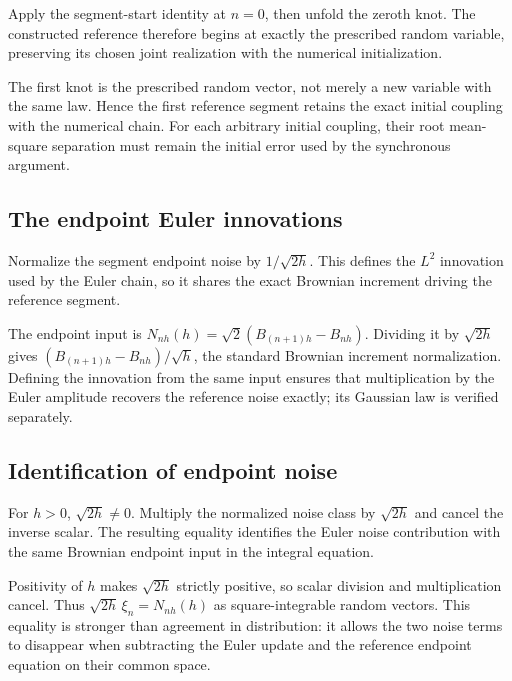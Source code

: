 \documentclass[11pt,a4paper]{report}
\begin{document}
Apply the segment-start identity at \(n=0\), then unfold the zeroth knot. The constructed reference therefore begins at exactly the prescribed random variable, preserving its chosen joint realization with the numerical initialization.



The first knot is the prescribed random vector, not merely a new variable with the same law. Hence the first reference segment retains the exact initial coupling with the numerical chain. For each arbitrary initial coupling, their root mean-square separation must remain the initial error used by the synchronous argument.

\subsection{\texorpdfstring{The endpoint Euler innovations}{The endpoint Euler innovations}}
\label{report-step-UnadjustedLangevin-BrownianReference-lean-7}


Normalize the segment endpoint noise by \(1/\sqrt{2h}\). This defines the \(L^2\) innovation used by the Euler chain, so it shares the exact Brownian increment driving the reference segment.



The endpoint input is \(N_{nh}(h)=\sqrt2(B_{(n+1)h}-B_{nh})\). Dividing it by \(\sqrt{2h}\) gives \((B_{(n+1)h}-B_{nh})/\sqrt h\), the standard Brownian increment normalization. Defining the innovation from the same input ensures that multiplication by the Euler amplitude recovers the reference noise exactly; its Gaussian law is verified separately.

\subsection{\texorpdfstring{Identification of endpoint noise}{Identification of endpoint noise}}
\label{report-step-UnadjustedLangevin-BrownianReference-lean-8}


For \(h>0\), \(\sqrt{2h}\ne0\). Multiply the normalized noise class by \(\sqrt{2h}\) and cancel the inverse scalar. The resulting equality identifies the Euler noise contribution with the same Brownian endpoint input in the integral equation.



Positivity of \(h\) makes \(\sqrt{2h}\) strictly positive, so scalar division and multiplication cancel. Thus \(\sqrt{2h}\,\xi_n=N_{nh}(h)\) as square-integrable random vectors. This equality is stronger than agreement in distribution: it allows the two noise terms to disappear when subtracting the Euler update and the reference endpoint equation on their common space.
\end{document}
